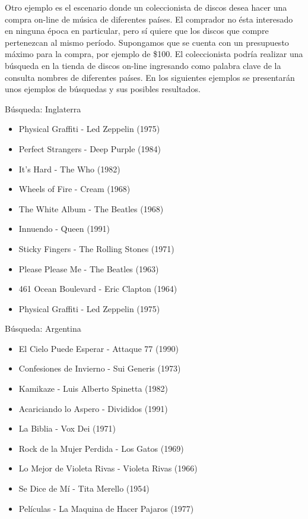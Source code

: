 Otro ejemplo es el escenario donde un coleccionista de discos desea hacer una compra on-line de música de diferentes países. El comprador no ésta interesado en ninguna época en particular, pero sí quiere que los discos que compre pertenezcan al mismo período. Supongamos que se cuenta con un presupuesto máximo para la compra, por ejemplo de \$100. El coleccionista podría realizar una búsqueda en la tienda de discos on-line ingresando como palabra clave de la consulta nombres de diferentes países. En los siguientes ejemplos se presentarán unos ejemplos de búsquedas y sus posibles resultados.

\begin{mybox}{Búsqueda: Inglaterra}
\begin{itemize}
	\item {\scriptsize Physical Graffiti - Led Zeppelin (1975)}
	\item {\scriptsize Perfect Strangers - Deep Purple (1984)}
	\item {\scriptsize It's Hard - The Who  (1982)}
	\item {\scriptsize Wheels of Fire - Cream (1968)}
	\item {\scriptsize The White Album - The Beatles (1968)}
	\item {\scriptsize Innuendo - Queen (1991)}
	\item {\scriptsize Sticky Fingers - The Rolling Stones (1971)}
	\item {\scriptsize Please Please Me - The Beatles (1963)}
	\item {\scriptsize 461 Ocean Boulevard - Eric Clapton (1964)}
	\item {\scriptsize Physical Graffiti - Led Zeppelin (1975)}
\end{itemize}
\end{mybox}

\begin{mybox}{Búsqueda: Argentina}
\begin{itemize}
	\item {\scriptsize El Cielo Puede Esperar - Attaque 77 (1990)}
	\item {\scriptsize Confesiones de Invierno - Sui Generis (1973)}
	\item {\scriptsize Kamikaze - Luis Alberto Spinetta (1982)}
	\item {\scriptsize Acariciando lo Aspero - Divididos (1991)}
	\item {\scriptsize La Biblia - Vox Dei (1971)}
	\item {\scriptsize Rock de la Mujer Perdida - Los Gatos (1969)}
	\item {\scriptsize Lo Mejor de Violeta Rivas - Violeta Rivas (1966)}
	\item {\scriptsize Se Dice de Mí - Tita Merello (1954)}
	\item {\scriptsize Películas - La Maquina de Hacer Pajaros (1977)}
\end{itemize}
\end{mybox}

